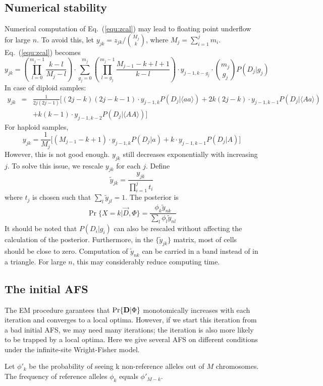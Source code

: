 \documentclass[pdftex,10pt]{book}
\begin{document}
\subsection{Numerical stability}\label{sec:numsta}
Numerical computation of Eq.~(\ref{equ:zcal}) may lead to floating point
underflow for large $n$. To avoid this, let
$y_{jk}=z_{jk}/\binom{M_j}{k}$, where
$M_j=\sum_{i=1}^jm_i$. Eq.~(\ref{equ:zcal}) becomes
$$
y_{jk}=\left(\prod_{l=0}^{m_j-1}\frac{k-l}{M_{j}-l}\right)\cdot\sum_{g_j=0}^{m_j}\left(\prod_{l=g_j}^{m_j-1}\frac{M_{j-1}-k+l+1}{k-l}\right)\cdot y_{j-1,k-g_j}\cdot\binom{m_j}{g_j}P(D_j|g_j)
$$
In case of diploid samples:
\begin{eqnarray*}
y_{jk}&=&\frac{1}{2j(2j-1)}\Big[(2j-k)(2j-k-1)\cdot y_{j-1,k}P(D_j|\langle aa\rangle)+2k(2j-k)\cdot y_{j-1,k-1}P(D_j|\langle Aa\rangle)\\
&&+k(k-1)\cdot y_{j-1,k-2}P(D_j|\langle AA\rangle)\Big]
\end{eqnarray*}
For haploid samples,
\[
y_{jk}=\frac{1}{M_{j}}\Big[(M_{j-1}-k+1)\cdot y_{j-1,k}P(D_j|a)+k\cdot y_{j-1,k-1}P(D_j|A)\Big]
\]
However, this is not good enough. $y_{jk}$ still decreases exponentially
with increasing $j$. To solve this issue, we rescale $y_{jk}$ for each
$j$. Define
$$
\tilde{y}_{jk}=\frac{y_{jk}}{\prod_{i=1}^j t_i}
$$
where $t_j$ is chosen such that $\sum_l\tilde{y}_{jl}=1$. The posterior is
$$
\Pr\{X=k|\vec{D},\Phi\}=\frac{\phi_k\tilde{y}_{nk}}{\sum_l\phi_l\tilde{y}_{nl}}
$$
It should be noted that $P(D_i|g_i)$ can also be rescaled without
affecting the calculation of the posterior. Furthermore, in the
$\{\tilde{y}_{jk}\}$ matrix, most of cells should be close to
zero. Computation of $\tilde{y}_{nk}$ can be carried in a band instead
of in a triangle. For large $n$, this may considerably reduce computing
time.

\subsection{The initial AFS}
The EM procedure garantees that $\Pr\{{\bf D}|\Phi\}$ monotomically
increases with each iteration and converges to a local optima. However,
if we start this iteration from a bad initial AFS, we may need many
iterations; the iteration is also more likely to be trapped by a local
optima. Here we give several AFS on different conditions under the
infinite-site Wright-Fisher model.

Let $\phi'_k$ be the probability of seeing k non-reference alleles out
of $M$ chromosomes. The frequency of reference alleles $\phi_k$ equals
$\phi'_{M-k}$.
\end{document}
